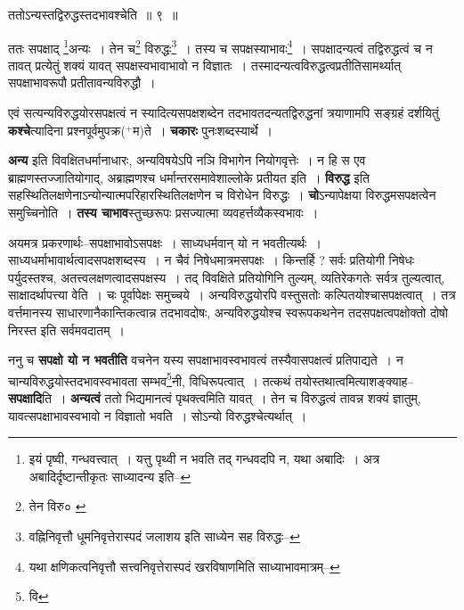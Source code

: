 \documentclass[article,12pt,a4paper]{memoir}
\newcommand{\add}[1]{($^{+}$#1)}
\begin{document}
	  \bigskip
	  \begingroup
	

	  \pstart ततोऽन्यस्तद्विरुद्धस्तदभावश्चेति ॥ ९ ॥
	\pend
      
	  \endgroup
	 

	  \pstart ततः सपक्षाद् \footnote{इयं पृष्वी, गन्धवत्त्वात् । यत्तु पृथ्वी न भवति तद् गन्धवदपि न, यथा अबादिः । अत्र अबादिर्दृष्टान्तीकृतः साध्यादन्य इति--\cite{dp-msD-n}}\-अन्यः । तेन च\footnote{तेन विरु० \cite{dp-msB}} विरुद्धः\footnote{वह्निनिवृत्तौ धूमनिवृत्तेरास्पदं जलाशय इति साध्येन सह विरुद्धः--\cite{dp-msD-n}} । तस्य च सपक्षस्याभावः\footnote{यथा क्षणिकत्वनिवृत्तौ सत्त्वनिवृत्तेरास्पदं खरविषाणमिति साध्याभावमात्रम्--\cite{dp-msD-n}} । सपक्षादन्यत्वं तद्विरुद्धत्वं च न तावत् प्रत्येतुं शक्यं यावत् सपक्षस्वभावाभावो न विज्ञातः । तस्मादन्यत्वविरुद्धत्वप्रतीतिसामर्थ्यात् सपक्षाभावरूपौ प्रतीतावन्यविरुद्धौ ।
	\pend
      
	  \endgroup
	

	  \pstart एवं सत्यन्यविरुद्धयोरसपक्षत्वं न स्यादित्यसपक्षशब्देन तदभावतदन्यतद्विरुद्धनां त्रयाणामपि सङ्ग्रहं दर्शयितुं \textbf{कश्चे}त्यादिना प्रश्नपूर्वमुपक्र\add{म}ते । \textbf{चकारः} पुनःशब्दस्यार्थे ।
	\pend
      

	  \pstart \textbf{अन्य} इति विवक्षितधर्मानाधारः, अन्यविषयेऽपि नञि विभागेन नियोगवृत्तेः । न हि स एव ब्राह्मणस्तज्जातियोगाद्, अब्राह्मणश्च धर्मान्तरसमावेशाल्लोके प्रतीयत इति । \textbf{विरुद्ध} इति सहस्थितिलक्षणेनाऽन्योन्यात्मपरिहारस्थितिलक्षणेन च विरोधेन विरुद्धः । \textbf{चो}ऽन्यापेक्षया विरुद्धमसपक्षत्वेन समुच्चिनोति । \textbf{तस्य चाभाव}स्तुच्छरूपः प्रसज्यात्मा व्यवहर्त्तव्यैकस्वभावः ।
	\pend
      

	  \pstart अयमत्र प्रकरणार्थः--सपक्षाभावोऽसपक्षः । साध्यधर्मवान् यो न भवतीत्यर्थः । साध्यधर्माभावार्थत्वादसपक्षशब्दस्य । न चैवं निषेधमात्रमसपक्षः । किन्तर्हि ? सर्वः प्रतियोगी निषेधः पर्युदस्तश्च, अतत्त्वलक्षणत्वादसपक्षस्य । तद् विवक्षिते प्रतियोगिनि तुल्यम्, व्यतिरेकगतेः सर्वत्र तुल्यत्वात्, साक्षादर्थापत्त्या वेति । चः पूर्वापेक्षः समुच्चये । अन्यविरुद्धयोरपि वस्तुसतोः कल्पितयोश्चासपक्षत्वात् । तत्र वर्त्तमानस्य साधारणानैकान्तिकत्वान्न तदभावदोषः, अन्यविरुद्धयोश्च स्वरूपकथनेन तदसपक्षत्वपक्षोक्तो दोषो निरस्त इति सर्वमवदातम् ।
	\pend
      

	  \pstart ननु च \textbf{सपक्षो यो न भवतीति} वचनेन यस्य सपक्षाभावस्वभावत्वं तस्यैवासपक्षत्वं \leavevmode{}प्रतिपाद्यते । न चान्यविरुद्धयोस्तदभावस्वभावता सम्भव\footnote{वि}\-नी, विधिरूपत्वात् । तत्कथं तयोस्तथात्वमित्याशङ्क्याह--\textbf{सपक्षादि}ति । \textbf{अन्यत्वं} ततो भिद्यमानत्वं पृथक्त्वमिति यावत् । तेन च विरुद्धत्वं तावन्न शक्यं ज्ञातुम्, यावत्सपक्षाभावस्वभावो न विज्ञातो भवति । सोऽन्यो विरुद्धश्चेत्यर्थात् ।
	\pend
      
\end{document}
